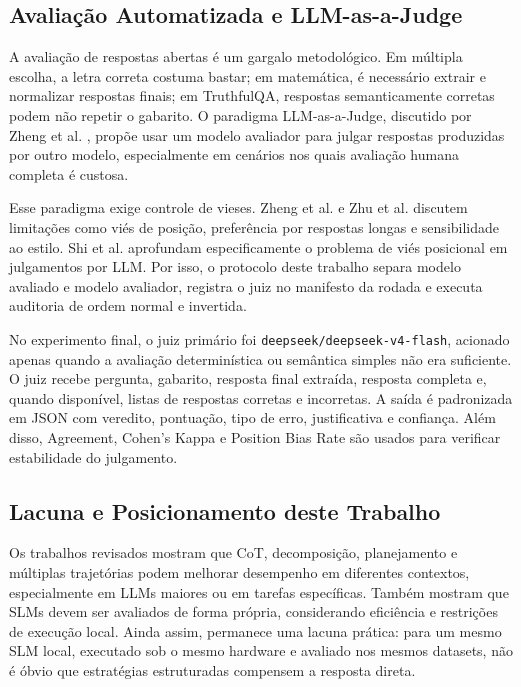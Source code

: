 \documentclass[12pt]{article}
\begin{document}
\subsection{Avaliação Automatizada e LLM-as-a-Judge}

A avaliação de respostas abertas é um gargalo metodológico. Em múltipla escolha, a letra correta costuma bastar; em matemática, é necessário extrair e normalizar respostas finais; em TruthfulQA, respostas semanticamente corretas podem não repetir o gabarito. O paradigma LLM-as-a-Judge, discutido por Zheng et al. \cite{zheng2023}, propõe usar um modelo avaliador para julgar respostas produzidas por outro modelo, especialmente em cenários nos quais avaliação humana completa é custosa.

Esse paradigma exige controle de vieses. Zheng et al. \cite{zheng2023} e Zhu et al. \cite{zhu2023} discutem limitações como viés de posição, preferência por respostas longas e sensibilidade ao estilo. Shi et al. \cite{shi2024position} aprofundam especificamente o problema de viés posicional em julgamentos por LLM. Por isso, o protocolo deste trabalho separa modelo avaliado e modelo avaliador, registra o juiz no manifesto da rodada e executa auditoria de ordem normal e invertida.

No experimento final, o juiz primário foi \texttt{deepseek/deepseek-v4-flash}, acionado apenas quando a avaliação determinística ou semântica simples não era suficiente. O juiz recebe pergunta, gabarito, resposta final extraída, resposta completa e, quando disponível, listas de respostas corretas e incorretas. A saída é padronizada em JSON com veredito, pontuação, tipo de erro, justificativa e confiança. Além disso, Agreement, Cohen's Kappa e Position Bias Rate são usados para verificar estabilidade do julgamento.

\subsection{Lacuna e Posicionamento deste Trabalho}

Os trabalhos revisados mostram que CoT, decomposição, planejamento e múltiplas trajetórias podem melhorar desempenho em diferentes contextos, especialmente em LLMs maiores ou em tarefas específicas. Também mostram que SLMs devem ser avaliados de forma própria, considerando eficiência e restrições de execução local. Ainda assim, permanece uma lacuna prática: para um mesmo SLM local, executado sob o mesmo hardware e avaliado nos mesmos datasets, não é óbvio que estratégias estruturadas compensem a resposta direta.
\end{document}
